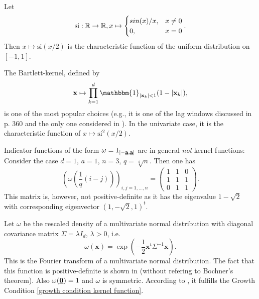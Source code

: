 \begin{ex} \label{ex:kernel}
    \begin{aufzii}     
        \item Let
        \[ \mathrm{si}: \mathbb{R} \to \mathbb{R}, x \mapsto \begin{cases} sin(x)/x, & x \neq 0 \\ 0, & x = 0  \end{cases}. \]
        Then $x \mapsto \mathrm{si}(x/2)$ is the characteristic function of the uniform distribution on $[-1, 1]$.
        \item The Bartlett-kernel, defined by 
        \begin{equation*}
            \mathbf{x} \mapsto \prod_{k = 1}^d \mathbbm{1}_{| \mathbf{x}_k| < 1} (1 - | \mathbf{x}_k|),
        \end{equation*}
        is one of the most popular choices (e.g., it is one of the lag windows discussed in \cite{brockwell1991time} p. 360 and the only one considered in \cite{[33]lavancier2008VStest}). In the univariate case, it is the characteristic function of $x \mapsto \mathrm{si}^2(x/2)$.
        \item Indicator functions of the form $\omega = 1_{[-\usbf[a], \usbf[a]]}$ are in general \emph{not} kernel functions: Consider the case $d=1$, $a = 1$, $n = 3$, $q = \sqrt[4]{n}$. Then one has
        \[ \left(\omega\left( \frac{1}{q} (i - j) \right)\right)_{i, j = 1, ..., n} = \begin{pmatrix}
            1  & 1 & 0 \\ 1 & 1 & 1 \\ 0 & 1 & 1
        \end{pmatrix}. \]
        This matrix is, however, not positive-definite as it has the eigenvalue $1 - \sqrt{2}$ with corresponding eigenvector $(1, -\sqrt{2}, 1)^t$.

        \item Let $\omega$ be the rescaled density of a multivariate normal distribution with diagonal covariance matrix $\Sigma = \lambda I_{d}$, $\lambda > 0$, i.e.
        \[ \omega(\mathbf{x}) = \exp\left(-\frac{1}{2} \mathbf{x}^t \Sigma^{-1} \mathbf{x} \right). \]
        This is the Fourier transform of a multivariate normal distribution. The fact that this function is positive-definite is shown in \cite{schoenberg1938positivedefinite} (without refering to Bochner's theorem). Also $\omega(\usbf[0]) = 1$ and $\omega$ is symmetric.
        According to \cite{[0]BUCCHIA2017344}, it fulfills the Growth Condition \eqref{growth condition kernel function}.
    
    \end{aufzii}
\end{ex}
